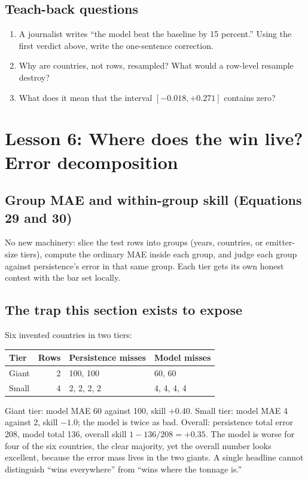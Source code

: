\documentclass[11pt]{article}
\begin{document}
\subsection{Teach-back questions}

\begin{enumerate}
\item A journalist writes ``the model beat the baseline by 15 percent.''
Using the first verdict above, write the one-sentence correction.
\item Why are countries, not rows, resampled? What would a row-level
resample destroy?
\item What does it mean that the interval $[-0.018, +0.271]$ contains
zero?
\end{enumerate}

\section{Lesson 6: Where does the win live? Error decomposition}

\subsection{Group MAE and within-group skill (Equations 29 and 30)}

No new machinery: slice the test rows into groups (years, countries, or
emitter-size tiers), compute the ordinary MAE inside each group, and
judge each group against persistence's error in that same group. Each
tier gets its own honest contest with the bar set locally.

\subsection{The trap this section exists to expose}

Six invented countries in two tiers:

\begin{center}
\begin{tabular}{lrll}
\toprule
Tier & Rows & Persistence misses & Model misses \\
\midrule
Giant & 2 & 100, 100 & 60, 60 \\
Small & 4 & 2, 2, 2, 2 & 4, 4, 4, 4 \\
\bottomrule
\end{tabular}
\end{center}

Giant tier: model MAE 60 against 100, skill $+0.40$. Small tier: model
MAE 4 against 2, skill $-1.0$; the model is twice as bad. Overall:
persistence total error 208, model total 136, overall skill
$1 - 136/208 = +0.35$. The model is worse for four of the six countries,
the clear majority, yet the overall number looks excellent, because the
error mass lives in the two giants. A single headline cannot distinguish
``wins everywhere'' from ``wins where the tonnage is.''
\end{document}
